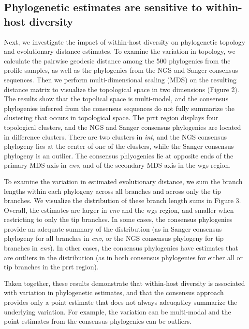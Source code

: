 \documentclass[letterpaper]{article}
\begin{document}
\subsection*{Phylogenetic estimates are sensitive to within-host diversity}

Next, we investigate the impact of within-host diversity on phylogenetic topology and evolutionary distance estimates. To examine the variation in topology, we calculate the pairwise geodesic distance \parencite{billera,owen} among the 500 phylogenies from the profile samples, as well as the phylogenies from the NGS and Sanger consensus sequences. Then we perform multi-dimensional scaling (MDS) on the resulting distance matrix to visualize the topological space in two dimensions (Figure 2). The results show that the topolical space is multi-model, and the consensus phylogenies inferred from the consensus sequences do not fully summarize the clustering that occurs in topological space. The prrt region displays four topological clusters, and the NGS and Sanger consensus phylogenies are located in difference clusters. There are two clusters in \emph{int}, and the NGS consensus phylogeny lies at the center of one of the clusters, while the Sanger consensus phylogeny is an outlier. The consensus phlyogenies lie at opposite ends of the primary MDS axis in \emph{env}, and of the secondary MDS axis in the wgs region.

To examine the variation in estimated evolutionary distance, we sum the branch lengths within each phylogeny across all branches and across only the tip branches. We visualize the distribution of these branch length sums in Figure 3. Overall, the estimates are larger in \emph{env} and the wgs region, and smaller when restricting to only the tip branches. In some cases, the consensus phylogenies provide an adequate summary of the distribution (as in Sanger consensus phylogeny for all branches in \emph{env}, or the NGS consensus phylogeny for tip branches in \emph{env}). In other cases, the consensus phylogenies have estimates that are outliers in the distribution (as in both consensus phylogenies for either all or tip branches in the prrt region).

Taken together, these results demonstrate that within-host diversity is associated with variation in phylogenetic estimates, and that the consensus approach provides only a point estimate that does not always adeuqatley summarize the underlying variation. For example, the variation can be multi-modal and the point estimates from the consensus phylogenies can be outliers.
\end{document}
